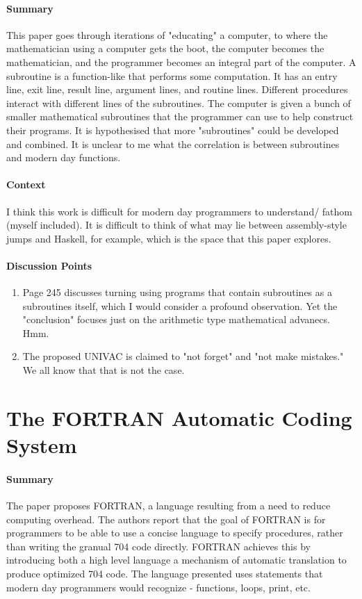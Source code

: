 \paragraph{\textbf{Summary}}
This paper goes through iterations of "educating" a computer, to where the
mathematician using a computer gets the boot, the computer becomes the
mathematician, and the programmer becomes an integral part of the computer. A
subroutine is a function-like that performs some computation. It has an entry
line, exit line, result line, argument lines, and routine lines. Different
procedures interact with different lines of the subroutines. The computer is
given a bunch of smaller mathematical subroutines that the programmer can use to
help construct their programs. It is hypothesised that more "subroutines" could
be developed and combined. It is unclear to me what the correlation is between
subroutines and modern day functions.
\paragraph{\textbf{Context}}
I think this work is difficult for modern day programmers to understand/ fathom
(myself included). It is difficult to think of what may lie between
assembly-style jumps and Haskell, for example, which is the space that this
paper explores.
\paragraph{\textbf{Discussion Points}}
\begin{enumerate}
    \item Page 245 discusses turning using programs that contain subroutines as
    a subroutines itself, which I would consider a profound observation. Yet the
    "conclusion" focuses just on the arithmetic type mathematical advanecs. Hmm.
    \item The proposed UNIVAC is claimed to "not forget" and "not make
    mistakes." We all know that that is not the case.
\end{enumerate}


\section {The FORTRAN Automatic Coding System \cite{backus1957fortran}}

\paragraph{\textbf{Summary}}
The paper proposes FORTRAN, a language resulting from a need to reduce computing
overhead. The authors report that the goal of FORTRAN is for programmers to be
able to use a concise language to specify procedures, rather than writing the
granual 704 code directly. FORTRAN achieves this by introducing both a high
level language a mechanism of automatic translation to produce optimized 704
code. The language presented uses statements that modern day programmers would
recognize - functions, loops, print, etc.

